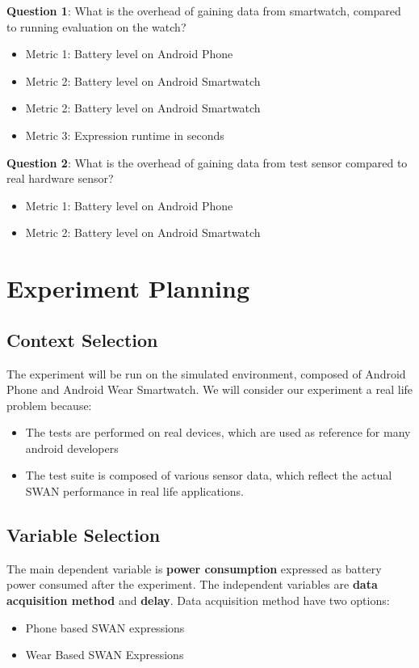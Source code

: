 \textbf{Question 1}: What is the overhead of gaining data from smartwatch, compared to running evaluation on the watch?
\begin{itemize}
  \item Metric 1:  Battery level on Android Phone
  \item Metric 2:  Battery level on Android Smartwatch
  \item Metric 2:  Battery level on Android Smartwatch
  \item  Metric 3:  Expression runtime in seconds
\end{itemize}

\textbf{Question 2}:  What is the overhead of gaining data from test sensor compared to real hardware sensor?
\begin{itemize}
 \item Metric 1:  Battery level on Android Phone
 \item Metric 2: Battery level on Android Smartwatch
\end{itemize}

\section{Experiment Planning}
\subsection{Context Selection}
The experiment will be run on the simulated environment, composed of Android Phone and Android Wear Smartwatch. We will consider our experiment a real life problem because:
\begin{itemize}
 \item The tests are performed on real devices, which are used as reference for many android developers
 \item The test suite is composed of various sensor data, which reflect the actual SWAN performance in real life applications.
\end{itemize}

\subsection{Variable Selection}

The main dependent variable is \textbf{power consumption} expressed as battery power consumed after the experiment.
The independent variables are \textbf{data acquisition method} and \textbf{delay}.
Data acquisition method  have two options:
\begin{itemize}
 \item Phone based SWAN expressions
 \item Wear Based SWAN Expressions
\end{itemize}

